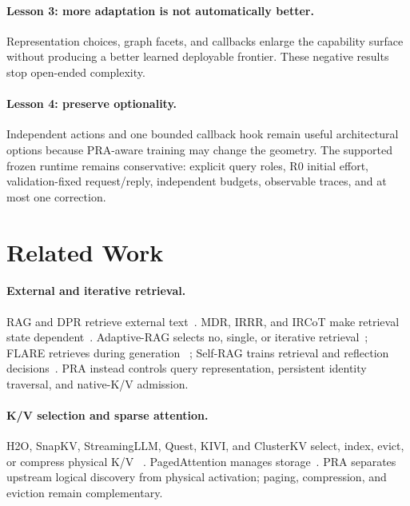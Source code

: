 \documentclass[11pt]{article}
\begin{document}
\paragraph{Lesson 3: more adaptation is not automatically better.}
Representation choices, graph facets, and callbacks enlarge the capability surface without
producing a better learned deployable frontier. These negative results stop open-ended complexity.

\paragraph{Lesson 4: preserve optionality.}
Independent actions and one bounded callback hook remain useful architectural options because
PRA-aware training may change the geometry. The supported frozen runtime remains conservative:
explicit query roles, R0 initial effort, validation-fixed request/reply, independent budgets,
observable traces, and at most one correction.

\section{Related Work}

\paragraph{External and iterative retrieval.}
RAG and DPR retrieve external text~\cite{lewis2020rag,karpukhin2020dpr}. MDR, IRRR, and IRCoT make
retrieval state dependent~\cite{xiong2021mdr,qi2021irrr,trivedi2023ircot}. Adaptive-RAG selects no,
single, or iterative retrieval~\cite{jeong2024adaptiverag}; FLARE retrieves during generation
~\cite{jiang2023flare}; Self-RAG trains retrieval and reflection decisions~\cite{asai2024selfrag}.
PRA instead controls query representation, persistent identity traversal, and native-K/V admission.

\paragraph{K/V selection and sparse attention.}
H2O, SnapKV, StreamingLLM, Quest, KIVI, and ClusterKV select, index, evict, or compress physical K/V
~\cite{zhang2023h2o,li2024snapkv,xiao2023streamingllm,tang2024quest,liu2024kivi,liu2024clusterkv}.
PagedAttention manages storage~\cite{kwon2023vllm}. PRA separates upstream logical discovery from
physical activation; paging, compression, and eviction remain complementary.
\end{document}
